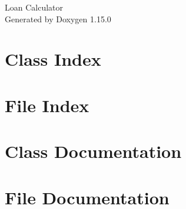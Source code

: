 \documentclass[twoside]{book}
\newcommand{\+}{\discretionary{\mbox{\scriptsize$\hookleftarrow$}}{}{}}
\newcommand{\clearemptydoublepage}{%
    \newpage{\pagestyle{empty}\cleardoublepage}%
  }
\begin{document}
  \raggedbottom
    \hypersetup{pageanchor=false,
                bookmarksnumbered=true,
                pdfencoding=unicode
               }
  \begin{titlepage}
  \vspace*{7cm}
  \begin{center}%
  {\Large Loan Calculator}\\
  \vspace*{1cm}
  {\large Generated by Doxygen 1.15.0}\\
  \end{center}
  \end{titlepage}
  \clearemptydoublepage
  \tableofcontents
  \clearemptydoublepage
  \hypersetup{pageanchor=true}
\chapter{Class Index}

\chapter{File Index}

\chapter{Class Documentation}

\chapter{File Documentation}

  \backmatter
  \newpage
  \clearemptydoublepage
  \printindex
\end{document}
